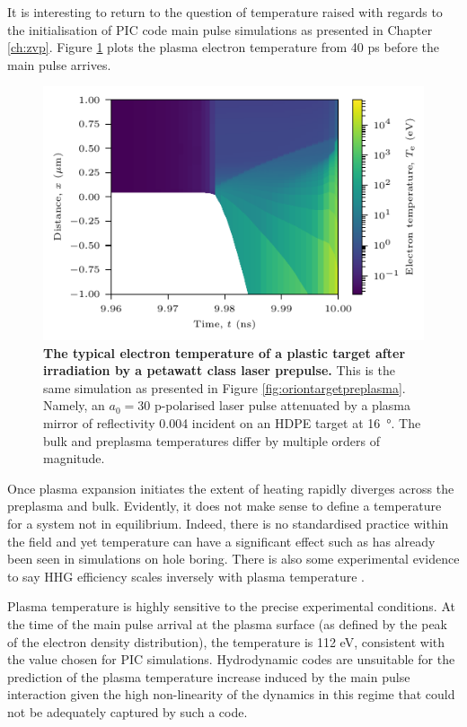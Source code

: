 It is interesting to return to the question of temperature raised with regards to the initialisation of PIC code main pulse simulations as presented in Chapter \ref{ch:zvp}. Figure \ref{fig:oriontemperature} plots the plasma electron temperature from 40 ps before the main pulse arrives.
\begin{figure}
	\centering
	\includegraphics{figures/orion/orion_temperature}
	\caption[Typical electron temperature of a plastic target after irradiation by a petawatt class laser prepulse.]{\textbf{The typical electron temperature of a plastic target after irradiation by a petawatt class laser prepulse.} This is the same simulation as presented in Figure \ref{fig:oriontargetpreplasma}. Namely, an $a_0 = 30$ p-polarised laser pulse attenuated by a plasma mirror of reflectivity 0.004 incident on an HDPE target at \qty{16}{\degree}. The bulk and preplasma temperatures differ by multiple orders of magnitude.}
	\label{fig:oriontemperature}
\end{figure}
Once plasma expansion initiates the extent of heating rapidly diverges across the preplasma and bulk. Evidently, it does not make sense to define a temperature for a system not in equilibrium. Indeed, there is no standardised practice within the field and yet temperature can have a significant effect such as has already been seen in simulations on hole boring. There is also some experimental evidence to say HHG efficiency scales inversely with plasma temperature \cite{kahalyDirectObservationDensityGradient2013}. 

Plasma temperature is highly sensitive to the precise experimental conditions. At the time of the main pulse arrival at the plasma surface (as defined by the peak of the electron density distribution), the temperature is 112 eV, consistent with the value chosen for PIC simulations. Hydrodynamic codes are unsuitable for the prediction of the plasma temperature increase induced by the main pulse interaction given the high non-linearity of the dynamics in this regime that could not be adequately captured by such a code.

